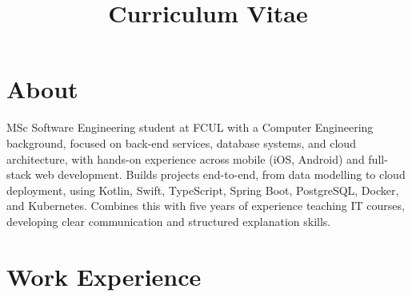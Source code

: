 \documentclass[11pt,a4paper]{moderncv}
\title{Curriculum Vitae}
\begin{document}
\makecvtitle

\section{About}
MSc Software Engineering student at FCUL with a Computer Engineering background, focused on back-end services, database systems, and cloud architecture, with hands-on experience across mobile (iOS, Android) and full-stack web development. Builds projects end-to-end, from data modelling to cloud deployment, using Kotlin, Swift, TypeScript, Spring Boot, PostgreSQL, Docker, and Kubernetes. Combines this with five years of experience teaching IT courses, developing clear communication and structured explanation skills.


\section{Work Experience}
\end{document}
